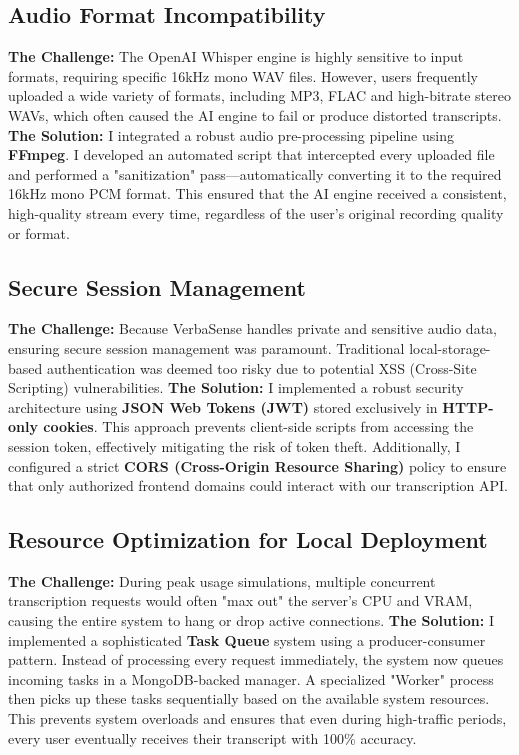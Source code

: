 \documentclass[oneside]{thesis-library}
\begin{document}
\subsection{Audio Format Incompatibility}
\textbf{The Challenge:} The OpenAI Whisper engine is highly sensitive to input formats, requiring specific 16kHz mono WAV files. However, users frequently uploaded a wide variety of formats, including MP3, FLAC and high-bitrate stereo WAVs, which often caused the AI engine to fail or produce distorted transcripts.
\textbf{The Solution:} I integrated a robust audio pre-processing pipeline using \textbf{FFmpeg}. I developed an automated script that intercepted every uploaded file and performed a "sanitization" pass—automatically converting it to the required 16kHz mono PCM format. This ensured that the AI engine received a consistent, high-quality stream every time, regardless of the user's original recording quality or format.
\subsection{Secure Session Management}
\textbf{The Challenge:} Because VerbaSense handles private and sensitive audio data, ensuring secure session management was paramount. Traditional local-storage-based authentication was deemed too risky due to potential XSS (Cross-Site Scripting) vulnerabilities.
\textbf{The Solution:} I implemented a robust security architecture using \textbf{JSON Web Tokens (JWT)} stored exclusively in \textbf{HTTP-only cookies}. This approach prevents client-side scripts from accessing the session token, effectively mitigating the risk of token theft. Additionally, I configured a strict \textbf{CORS (Cross-Origin Resource Sharing)} policy to ensure that only authorized frontend domains could interact with our transcription API.
\subsection{Resource Optimization for Local Deployment}
\textbf{The Challenge:} During peak usage simulations, multiple concurrent transcription requests would often "max out" the server's CPU and VRAM, causing the entire system to hang or drop active connections.
\textbf{The Solution:} I implemented a sophisticated \textbf{Task Queue} system using a producer-consumer pattern. Instead of processing every request immediately, the system now queues incoming tasks in a MongoDB-backed manager. A specialized "Worker" process then picks up these tasks sequentially based on the available system resources. This prevents system overloads and ensures that even during high-traffic periods, every user eventually receives their transcript with 100\% accuracy.
\end{document}
